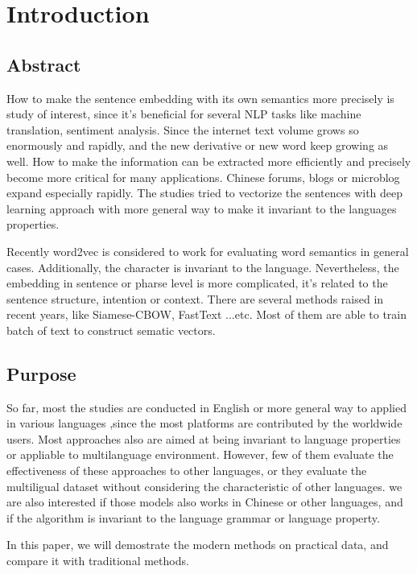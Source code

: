 \chapter{Introduction}
\setlength{\baselineskip}{1.5em}
\setlength{\parindent}{2em}
\setlength{\parskip}{1em}

\section{Abstract}

How to make the sentence embedding with its own semantics more precisely is study of interest, since it's beneficial for several NLP tasks like machine translation, sentiment analysis. 
Since the internet text volume grows so enormously and rapidly, and the new derivative or new word keep growing as well.
How to make the information can be extracted more efficiently and precisely become more critical for many applications.  
Chinese forums, blogs or microblog expand especially rapidly. The studies tried to vectorize the sentences with deep learning approach with more general way to make it invariant to the languages properties.  


Recently word2vec\cite{word2vec} is considered to work for evaluating word semantics in general cases.  
Additionally, the character is invariant to the language. Nevertheless, 
the embedding in sentence or pharse level is more complicated, it's related to the sentence structure,  
intention or context. There are several methods raised in recent years, like Siamese-CBOW, FastText ...etc. 
Most of them are able to train batch of text to construct sematic vectors.

\section{Purpose}

So far, most the studies are conducted in English or more general way to applied in various languages
,since the most platforms are contributed by the worldwide users. Most approaches also are aimed at being invariant to language properties or appliable to multilanguage environment. 
However, few of them evaluate the effectiveness of these approaches to other languages, or they evaluate the multiligual dataset without considering the characteristic of other languages.   
we are also interested if those models also works in Chinese or other languages, and if the algorithm is invariant to the language grammar or language property. 

In this paper, we will demostrate the modern methods on practical data, and compare it with traditional methods.